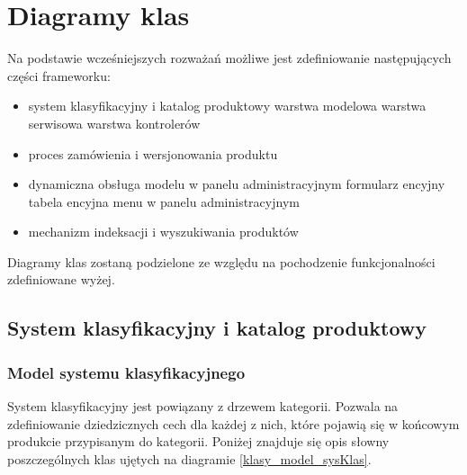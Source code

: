 \newpage
\section{Diagramy klas}

Na podstawie wcześniejszych rozważań możliwe jest zdefiniowanie następujących części frameworku: 
\begin{itemize}
	\item system klasyfikacyjny i katalog produktowy
	\subitem warstwa modelowa
	\subitem warstwa serwisowa
	\subitem warstwa kontrolerów
	\item proces zamówienia i wersjonowania produktu
	\item dynamiczna obsługa modelu w panelu administracyjnym
	\subitem formularz encyjny
	\subitem tabela encyjna
	\subitem menu w panelu administracyjnym
	\item mechanizm indeksacji i wyszukiwania produktów
\end{itemize}
Diagramy klas zostaną podzielone ze względu na pochodzenie funkcjonalności zdefiniowane wyżej. 

\subsection{System klasyfikacyjny i katalog produktowy}

\subsubsection{Model systemu klasyfikacyjnego}
System klasyfikacyjny jest powiązany z drzewem kategorii. Pozwala na zdefiniowanie dziedzicznych cech dla każdej z nich, które pojawią się w końcowym produkcie przypisanym do kategorii. Poniżej znajduje się opis słowny poszczególnych klas ujętych na diagramie \ref{klasy_model_sysKlas}.


